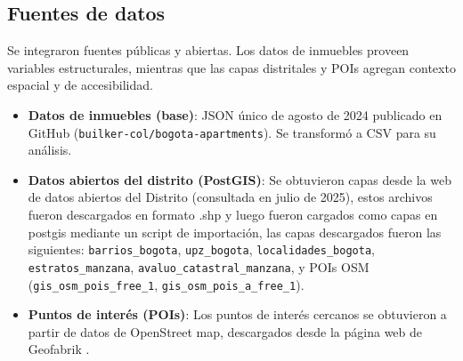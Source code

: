 \subsection*{Fuentes de datos}
Se integraron fuentes públicas y abiertas. 
Los datos de inmuebles proveen variables estructurales, mientras que las capas distritales y POIs agregan contexto espacial y de accesibilidad.
\begin{itemize}
    \item \textbf{Datos de inmuebles (base)}: JSON único de agosto de 2024 publicado en GitHub (\texttt{builker-col/bogota-apartments}). Se transformó a CSV para su análisis.
    \item \textbf{Datos abiertos del distrito (PostGIS)}: Se obtuvieron capas desde la web de datos abiertos del Distrito \cite{datosabiertos_bogota} 
    (consultada en julio de 2025), estos archivos fueron descargados en formato .shp y 
    luego fueron cargados como capas en postgis mediante un script de importación, las capas
    descargados fueron las siguientes: \texttt{barrios\_bogota}, \texttt{upz\_bogota}, 
    \texttt{localidades\_bogota}, 
    \texttt{estratos\_manzana}, \texttt{avaluo\_catastral\_manzana}, 
    y POIs OSM (\texttt{gis\_osm\_pois\_free\_1}\allowbreak, \texttt{gis\_osm\_pois\_a\_free\_1}).
    \item \textbf{Puntos de interés (POIs)}:
    Los puntos de interés cercanos se obtuvieron a partir de datos de OpenStreet map, 
    descargados desde la página web de Geofabrik \cite{geofabrik}.
\end{itemize}



